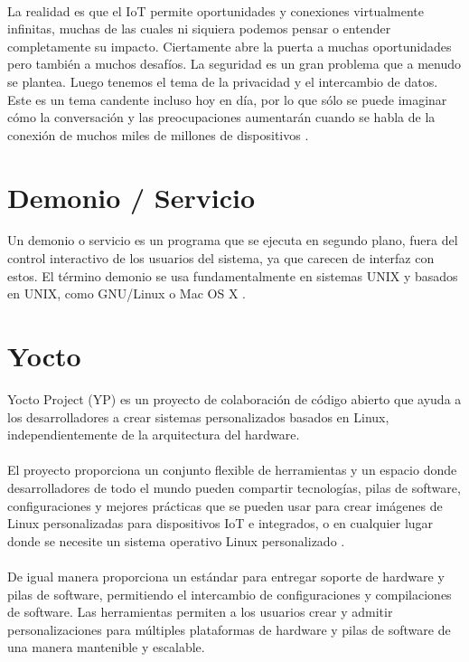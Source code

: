 \paragraph{}
La realidad es que el IoT permite oportunidades y conexiones virtualmente infinitas, muchas de las cuales ni siquiera podemos pensar o entender completamente su impacto. Ciertamente abre la puerta a muchas oportunidades pero también a muchos desafíos. La seguridad es un gran problema que a menudo se plantea. Luego tenemos el tema de la privacidad y el intercambio de datos. Este es un tema candente incluso hoy en día, por lo que sólo se puede imaginar cómo la conversación y las preocupaciones aumentarán cuando se habla de la conexión de muchos miles de millones de dispositivos \citep{MarcoTeoricoIoT2}. 



\section{Demonio / Servicio}
Un demonio o servicio es un programa que se ejecuta en segundo plano, fuera del control interactivo de los usuarios del sistema, ya que carecen de interfaz con estos. El término demonio se usa fundamentalmente en sistemas UNIX y basados en UNIX, como GNU/Linux o Mac OS X \citep{MarcoTeorico4}.

\section{Yocto}
Yocto Project (YP) es un proyecto de colaboración de código abierto que ayuda a los desarrolladores a crear sistemas personalizados basados en Linux, independientemente de la arquitectura del hardware.
\paragraph{}
El proyecto proporciona un conjunto flexible de herramientas y un espacio donde desarrolladores de todo el mundo pueden compartir tecnologías, pilas de software, configuraciones y mejores prácticas que se pueden usar para crear imágenes de Linux personalizadas para dispositivos IoT e integrados, o en cualquier lugar donde se necesite un sistema operativo Linux personalizado \citep{MarcoTeoricoYocto}.
\paragraph{}
De igual manera proporciona un estándar para entregar soporte de hardware y pilas de software, permitiendo el intercambio de configuraciones y compilaciones de software. Las herramientas permiten a los usuarios crear y admitir personalizaciones para múltiples plataformas de hardware y pilas de software de una manera mantenible y escalable.
